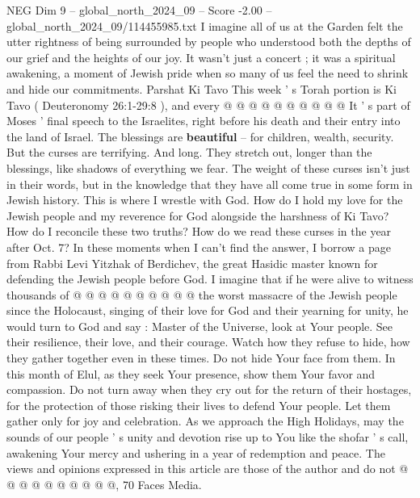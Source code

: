 \begin{textsample}{NEG Dim 9 – global\_north\_2024\_09 – Score -2.00 – global\_north\_2024\_09/114455985.txt}
I imagine all of us at the Garden felt the utter rightness of being surrounded by people who understood both the depths of our grief and the heights of our joy.
It wasn't just a concert ; it was a spiritual awakening, a moment of Jewish pride when so many of us feel the need to shrink and hide our commitments.
Parshat Ki Tavo This week ' s Torah portion is Ki Tavo ( Deuteronomy 26:1-29:8 ), and every @ @ @ @ @ @ @ @ @ @ It ' s part of Moses ' final speech to the Israelites, right before his death and their entry into the land of Israel.
The blessings are \textbf{beautiful} -- for children, wealth, security.
But the curses are terrifying.
And long.
They stretch out, longer than the blessings, like shadows of everything we fear.
The weight of these curses isn't just in their words, but in the knowledge that they have all come true in some form in Jewish history.
This is where I wrestle with God.
How do I hold my love for the Jewish people and my reverence for God alongside the harshness of Ki Tavo?
How do I reconcile these two truths?
How do we read these curses in the year after Oct. 7?
In these moments when I can't find the answer, I borrow a page from Rabbi Levi Yitzhak of Berdichev, the great Hasidic master known for defending the Jewish people before God.
I imagine that if he were alive to witness thousands of @ @ @ @ @ @ @ @ @ @ the worst massacre of the Jewish people since the Holocaust, singing of their love for God and their yearning for unity, he would turn to God and say : Master of the Universe, look at Your people.
See their resilience, their love, and their courage.
Watch how they refuse to hide, how they gather together even in these times.
Do not hide Your face from them.
In this month of Elul, as they seek Your presence, show them Your favor and compassion.
Do not turn away when they cry out for the return of their hostages, for the protection of those risking their lives to defend Your people.
Let them gather only for joy and celebration.
As we approach the High Holidays, may the sounds of our people ' s unity and devotion rise up to You like the shofar ' s call, awakening Your mercy and ushering in a year of redemption and peace.
The views and opinions expressed in this article are those of the author and do not @ @ @ @ @ @ @ @ @ @, 70 Faces Media.

\end{textsample}
